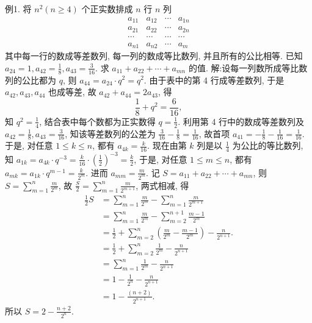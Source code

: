 例1. 将 $n^2(n \geqslant 4)$ 个正实数排成 $n$ 行 $n$ 列
$$
\begin{array}{cccc}
a_{11} & a_{12} & \cdots & a_{1 n} \\
a_{21} & a_{22} & \cdots & a_{2 n} \\
\cdots & \cdots & \cdots & \cdots \\
a_{n 1} & a_{n 2} & \cdots & a_m
\end{array}
$$
其中每一行的数成等差数列, 每一列的数成等比数列, 并且所有的公比相等.
已知 $a_{24}=1, a_{42}=\frac{1}{8}, a_{43}=\frac{3}{16}$. 求 $a_{11}+a_{22}+\cdots+a_{m n}$ 的值.
解:设每一列数所成等比数列的公比都为 $q$, 则 $a_{44}=a_{24} \cdot q^2=q^2$.
由于表中的第 4 行成等差数列, 于是 $a_{42}, a_{43}, a_{44}$ 也成等差, 故 $a_{42}+ a_{44}=2 a_{43}$, 得
$$
\frac{1}{8}+q^2=\frac{6}{16},
$$
知 $q^2=\frac{1}{4}$, 结合表中每个数都为正实数得 $q=\frac{1}{2}$.
利用第 4 行中的数成等差数列及 $a_{42}=\frac{1}{8}, a_{43}=\frac{3}{16}$, 知该等差数列的公差为 $\frac{3}{16}-\frac{1}{8}=\frac{1}{16}$, 故首项 $a_{41}=-\frac{1}{8}-\frac{1}{16}=\frac{1}{16}$. 于是, 对任意 $1 \leqslant k \leqslant n$, 都有 $a_{4 k}=\frac{k}{16}$.
现在由第 $k$ 列是以 $\frac{1}{4}$ 为公比的等比数列, 知 $a_{1 k}=a_{4 k} \cdot q^{-3}=\frac{k}{16} \cdot\left(\frac{1}{2}\right)^{-3}= \frac{k}{2}$, 于是, 对任意 $1 \leqslant m \leqslant n$, 都有 $a_{m k}=a_{1 k} \cdot q^{m-1}=\frac{k}{2^m}$. 进而 $a_{m m}=\frac{m}{2^m}$.
记 $S=a_{11}+a_{22}+\cdots+a_{m n}$, 则 $S=\sum_{m=1}^n \frac{m}{2^m}$, 故 $\frac{S}{2}=\sum_{m=1}^n \frac{m}{2^{m+1}}$, 两式相减, 得
$$
\begin{aligned}
\frac{1}{2} S & =\sum_{m=1}^n \frac{m}{2^m}-\sum_{m=1}^n \frac{m}{2^{m+1}} \\
& =\sum_{m=1}^n \frac{m}{2^m}-\sum_{m=2}^{n+1} \frac{m-1}{2^m} \\
& =\frac{1}{2}+\sum_{m=2}^n\left(\frac{m}{2^m}-\frac{m-1}{2^m}\right)-\frac{n}{2^{n+1}} . \\
& =\frac{1}{2}+\sum_{m=2}^n \frac{1}{2^m}-\frac{n}{2^{n+1}} \\
& =\sum_{m=1}^n \frac{1}{2^m}-\frac{n}{2^{n+1}} \\
& =1-\frac{1}{2^n}-\frac{n}{2^{n+1}} \\
& =1-\frac{(n+2)}{2^{n+1}} .
\end{aligned}
$$
所以 $S=2-\frac{n+2}{2^n}$.



